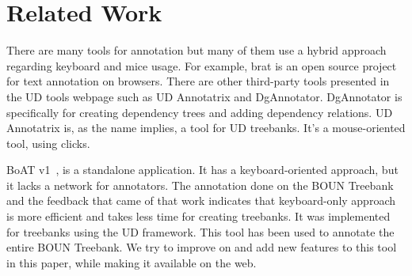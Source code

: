 \section{Related Work}
\label{sec:related}

There are many tools for annotation but many of them use a hybrid approach regarding keyboard and mice usage.
For example, brat is an open source project for text annotation on browsers.\cite{brat}\cite{UD}
There are other third-party tools presented in the UD tools webpage such as UD Annotatrix\cite{tyers-etal:2018} and DgAnnotator\cite{dgannotator}.
DgAnnotator is specifically for creating dependency trees and adding dependency relations.
UD Annotatrix is, as the name implies, a tool for UD treebanks.
It's a mouse-oriented tool, using clicks.

BoAT v1~\cite{turk-etal-2019-turkish}, is a standalone application.
It has a keyboard-oriented approach, but it lacks a network for annotators.
The annotation done on the BOUN Treebank and the feedback that came of that work indicates that keyboard-only approach is more efficient and takes less time for creating treebanks.
It was implemented for treebanks using the UD framework.
This tool has been used to annotate the entire BOUN Treebank.
We try to improve on and add new features to this tool in this paper, while making it available on the web.